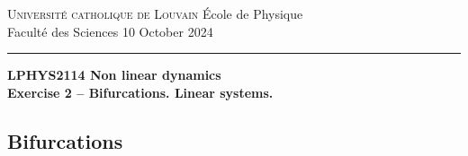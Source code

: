 \documentclass{article}
\begin{document}
\noindent
{\textsc{Universit\'e catholique de Louvain}} \hfill \'Ecole de Physique\\
Facult\'e des Sciences \hfill 10 October 2024\\
\hrule

\bigskip

\begin{center}
  \textbf{LPHYS2114 Non linear dynamics}\\
  \textbf{Exercise 2 -- Bifurcations. Linear systems.}
\end{center}

{}

\subsection*{Bifurcations}
\end{document}
